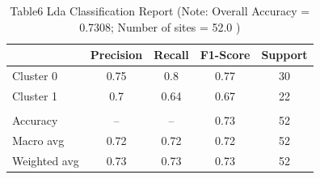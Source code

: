 
\begin{table}[htbp]
    \centering
    \small
    \caption{Table6 Lda Classification Report (Note: Overall Accuracy = 0.7308; Number of sites = 52.0 )}
    \label{tab:table6_lda_classification_report}
    \begin{tabular}{lcccc}
        \toprule
         & Precision & Recall & F1-Score & Support \\
        \midrule
        Cluster 0 & 0.75 & 0.8 & 0.77 & 30 \\
        Cluster 1 & 0.7 & 0.64 & 0.67 & 22 \\
         &  &  &  &  \\
        Accuracy & – & – & 0.73 & 52 \\
        Macro avg & 0.72 & 0.72 & 0.72 & 52 \\
        Weighted avg & 0.73 & 0.73 & 0.73 & 52 \\
        \bottomrule
    \end{tabular}
\end{table}

